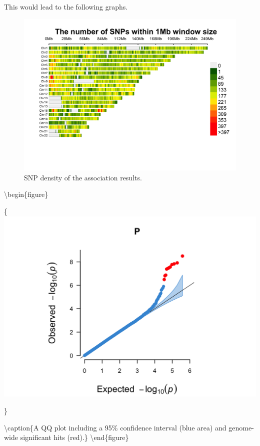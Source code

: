 \documentclass[
]{book}
\begin{document}
This would lead to the following graphs.

\begin{figure}

{\centering \includegraphics[width=18.67in]{img/WTCCC1ResultsManhattan-density} 

}

\caption{SNP density of the association results.}\label{fig:show-wtccc1-graphs-density}
\end{figure}

\textbackslash begin\{figure\}

\{\centering \includegraphics[width=18.67in]{img/WTCCC1ResultsManhattan-qq}

\}

\textbackslash caption\{A QQ plot including a 95\% confidence interval (blue area) and genome-wide significant hits (red).\}\label{fig:show-wtccc1-graphs-qq}
\textbackslash end\{figure\}
\end{document}
